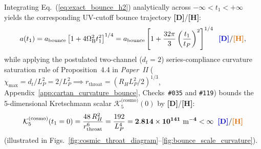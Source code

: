 \documentclass[11pt,a4paper]{article}
\newcommand{\catD}{\textbf{\textcolor{blue!75!black}{[D]}}}
\newcommand{\catH}{\textbf{\textcolor{orange!85!black}{[H]}}}
\theoremstyle{plain}
\theoremstyle{definition}
\theoremstyle{remark}
\numberwithin{equation}{section}
\begin{document}
Integrating Eq.~(\ref{eq:exact_bounce_h2}) analytically across $-\infty < t_1 < +\infty$ yields the corresponding UV-cutoff bounce trajectory \catD/\catH:
\begin{equation}
a(t_1) = a_{\text{bounce}} \left[ 1 + 4 \Omega_{\text{B}}^2 t_1^2 \right]^{1/4} = a_{\text{bounce}} \left[ 1 + \frac{32\pi}{3}\left(\frac{t_1}{t_P}\right)^2 \right]^{1/4} \;\;\catD/\catH,
\label{eq:exact_analytic_bounce_scale_factor}
\end{equation}
while applying the postulated two-channel ($d_t = 2$) series-compliance curvature saturation rule of Proposition~4.4 in \textit{Paper~II} \cite{jimenez2026b} ($\chi_{\max} = d_t/L_P^2 = 2/L_P^2 \implies r_{\text{throat}} = (R_H L_P^2 / 2)^{1/3}$, Appendix~\ref{app:cartan_curvature_bounce}, Checks~\texttt{\#035} and \texttt{\#119}) bounds the 5-dimensional Kretschmann scalar $\mathcal{K}_5^{\text{(cosmo)}}(0)$ by \catD/\catH:
\begin{equation}
\mathcal{K}_5^{\text{(cosmo)}}(t_1 = 0) = \frac{48\,R_H^2}{r_{\text{throat}}^6} = \frac{192}{L_P^4} = \mathbf{2.814 \times 10^{141}\text{ m}^{-4}} < \infty \;\;\catD/\catH
\label{eq:cosmo_kretschmann_bound}
\end{equation}
(illustrated in Figs.~\ref{fig:cosmic_throat_diagram}--\ref{fig:bounce_scale_curvature}).
\end{document}
